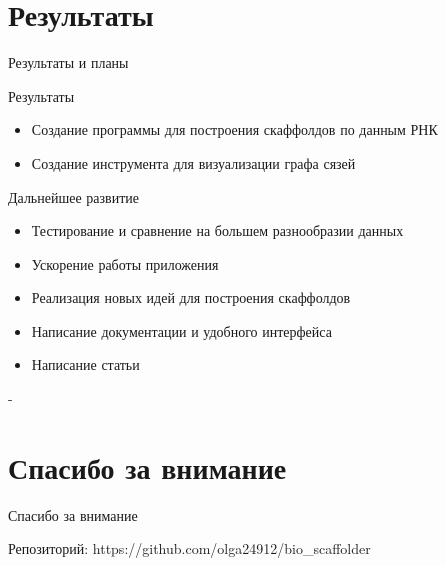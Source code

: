 \documentclass{beamer}
\begin{document}
\section{Результаты}
\begin{frame}[t]{Результаты и планы}
	\begin{block}{Результаты}
		\begin{itemize}
			\item Создание программы для построения скаффолдов по данным РНК 
			\item Создание инструмента для визуализации графа сязей%
		\end{itemize}
	\end{block}
	\begin{block}{Дальнейшее развитие}
		\begin{itemize}
			\item Тестирование и сравнение на большем разнообразии данных
			\item Ускорение работы приложения  
			\item Реализация новых идей для построения скаффолдов 
			\item Написание документации и удобного интерфейса
			\item Написание статьи
			\end{itemize}-
	\end{block}
\end{frame}


\section{Спасибо за внимание}
\begin{frame}{Спасибо за внимание}
    \begin{center}
        Репозиторий: https://github.com/olga24912/bio\_scaffolder
    \end{center}
\end{frame}
\end{document}

